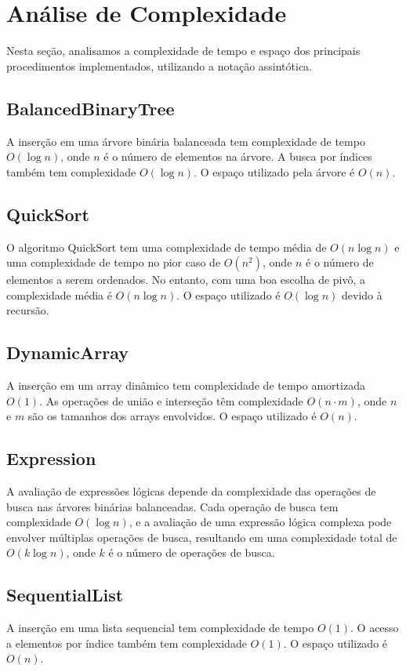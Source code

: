 \documentclass[a4paper,12pt]{article}
\begin{document}
\section{Análise de Complexidade}\hspace*{1cm}
Nesta seção, analisamos a complexidade de tempo e espaço dos principais procedimentos implementados, utilizando a notação assintótica.

\subsection{BalancedBinaryTree}
A inserção em uma árvore binária balanceada tem complexidade de tempo \(O(\log n)\), onde \(n\) é o número de elementos na árvore. A busca por índices também tem complexidade \(O(\log n)\). O espaço utilizado pela árvore é \(O(n)\).

\subsection{QuickSort}
O algoritmo QuickSort tem uma complexidade de tempo média de \(O(n \log n)\) e uma complexidade de tempo no pior caso de \(O(n^2)\), onde \(n\) é o número de elementos a serem ordenados. No entanto, com uma boa escolha de pivô, a complexidade média é \(O(n \log n)\). O espaço utilizado é \(O(\log n)\) devido à recursão.

\subsection{DynamicArray}
A inserção em um array dinâmico tem complexidade de tempo amortizada \(O(1)\). As operações de união e interseção têm complexidade \(O(n \cdot m)\), onde \(n\) e \(m\) são os tamanhos dos arrays envolvidos. O espaço utilizado é \(O(n)\).

\subsection{Expression}
A avaliação de expressões lógicas depende da complexidade das operações de busca nas árvores binárias balanceadas. Cada operação de busca tem complexidade \(O(\log n)\), e a avaliação de uma expressão lógica complexa pode envolver múltiplas operações de busca, resultando em uma complexidade total de \(O(k \log n)\), onde \(k\) é o número de operações de busca.

\subsection{SequentialList}
A inserção em uma lista sequencial tem complexidade de tempo \(O(1)\). O acesso a elementos por índice também tem complexidade \(O(1)\). O espaço utilizado é \(O(n)\).
\end{document}
